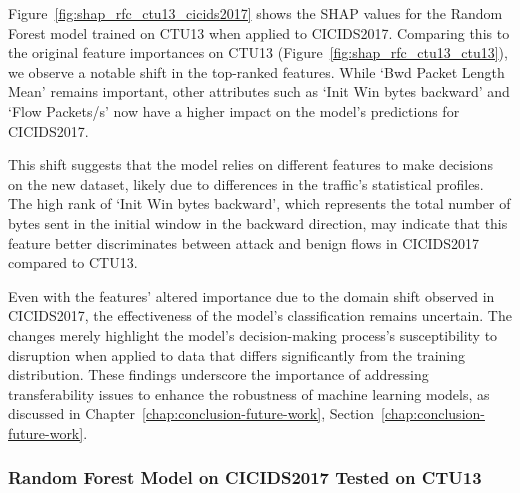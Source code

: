 Figure~\ref{fig:shap_rfc_ctu13_cicids2017} shows the SHAP values for the Random Forest model trained on CTU13 when applied to CICIDS2017. Comparing this to the original feature importances on CTU13 (Figure~\ref{fig:shap_rfc_ctu13_ctu13}), we observe a notable shift in the top-ranked features. While `Bwd Packet Length Mean' remains important, other attributes such as `Init Win bytes backward' and `Flow Packets/s' now have a higher impact on the model's predictions for CICIDS2017.

This shift suggests that the model relies on different features to make decisions on the new dataset, likely due to differences in the traffic's statistical profiles. The high rank of `Init Win bytes backward', which represents the total number of bytes sent in the initial window in the backward direction, may indicate that this feature better discriminates between attack and benign flows in CICIDS2017 compared to CTU13.

Even with the features' altered importance due to the domain shift observed in CICIDS2017, the effectiveness of the model's classification remains uncertain. The changes merely highlight the model's decision-making process's susceptibility to disruption when applied to data that differs significantly from the training distribution. These findings underscore the importance of addressing transferability issues to enhance the robustness of machine learning models, as discussed in Chapter~\ref{chap:conclusion-future-work}, Section~\ref{chap:conclusion-future-work}.

\subsubsection{Random Forest Model on CICIDS2017 Tested on CTU13}\label{subsec:rf-cicids2017-ctu13}

